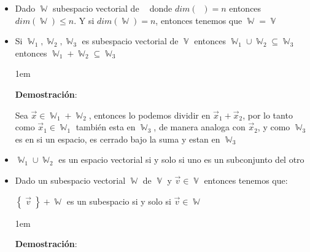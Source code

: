 \documentclass[12pt, fleqn]{report}                             %
\newenvironment{SmallIndentation}[1][0.75em]                    %
        {\begin{adjustwidth}{#1}{}\begin{footnotesize}}             %
        {\end{footnotesize}\end{adjustwidth}}                       %
\theoremstyle{break}                                            %
\DeclareMathOperator \GenericField {\mathbb{F}}                 %
\DeclareMathOperator \VectorSet    {\mathbb{V}}                 %
\DeclareMathOperator \SubVectorSet {\mathbb{W}}                 %
\DeclareMathOperator \VectorSpace  {\VectorSet_{\GenericField}} %
\newcommand{\Set}[1]    {\left\{ \; #1 \; \right\}}             %
\begin{document}
\begin{itemize}
                    \item
                        Dado $\SubVectorSet$ subespacio vectorial de $\VectorSpace$ donde $dim(\VectorSpace) = n$
                        entonces $dim(\SubVectorSet) \leq n$. Y si $dim(\SubVectorSet) = n$, entonces
                        tenemos que $\SubVectorSet = \VectorSet$ 
                            

                    \item
                        Si $\SubVectorSet_1, \SubVectorSet_2, \SubVectorSet_3$ es subespacio vectorial de $\VectorSet$
                        entonces $\SubVectorSet_1 \cup \SubVectorSet_2 \subseteq \SubVectorSet_3$ entonces
                        $\SubVectorSet_1 + \SubVectorSet_2 \subseteq \SubVectorSet_3$

                        \begin{SmallIndentation}[1em]
                            \textbf{Demostración}:
                            
                            Sea $\vec x \in \SubVectorSet_1 + \SubVectorSet_2$, entonces lo podemos dividir en
                            $\vec x_1 + \vec x_2$, por lo tanto como $\vec x_1 \in \SubVectorSet_1$ también esta
                            en $\SubVectorSet_3$, de manera analoga con $\vec x_2$, y como $\SubVectorSet_3$
                            es en si un espacio, es cerrado bajo la suma y estan en $\SubVectorSet_3$
                        \end{SmallIndentation}
                            

                    \item
                        $\SubVectorSet_1 \cup \SubVectorSet_2$ es un espacio vectorial si y solo si uno
                        es un subconjunto del otro

                    \item
                        Dado un subespacio vectorial $\SubVectorSet$ de $\VectorSet$ y $\vec v \in \VectorSet$
                        entonces tenemos que:

                        $\Set{\vec v} + \SubVectorSet$ es un subespacio si y solo si $\vec v \in \SubVectorSet$

                        \begin{SmallIndentation}[1em]
                            \textbf{Demostración}:
                            

\end{SmallIndentation}
\end{itemize}
\end{document}
